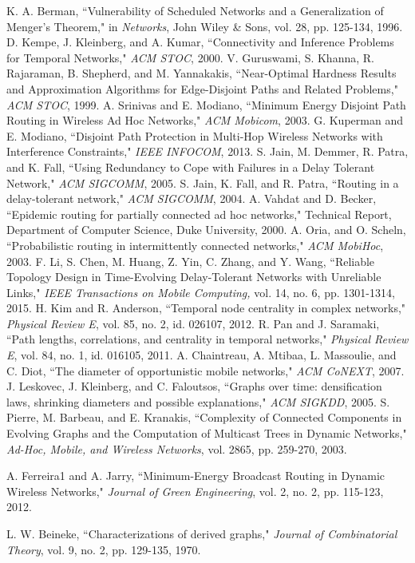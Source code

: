 \documentclass[10pt, conference, letterpaper]{IEEEtran}
\begin{document}
\begin{thebibliography}{1}
 K. A. Berman, ``Vulnerability of Scheduled Networks and a Generalization of Menger's Theorem,"  in \emph{Networks}, John Wiley \& Sons, vol. 28, pp. 125-134, 1996.
 D. Kempe, J. Kleinberg, and A. Kumar, ``Connectivity and Inference Problems for Temporal Networks," \emph{ACM STOC}, 2000.
 V. Guruswami, S. Khanna, R. Rajaraman, B. Shepherd, and M. Yannakakis, ``Near-Optimal Hardness Results and Approximation Algorithms for Edge-Disjoint Paths and Related Problems," \emph{ACM STOC}, 1999.
 A. Srinivas and E. Modiano, ``Minimum Energy Disjoint Path Routing in Wireless Ad Hoc Networks,"  \emph{ACM Mobicom}, 2003.
  G. Kuperman and E. Modiano, ``Disjoint Path Protection in Multi-Hop Wireless Networks with Interference Constraints,"  \emph{IEEE INFOCOM}, 2013.
 S. Jain, M. Demmer, R. Patra, and K. Fall, ``Using Redundancy to Cope with Failures in a Delay Tolerant Network,"  \emph{ACM SIGCOMM}, 2005.
 S. Jain, K. Fall, and R. Patra, ``Routing in a delay-tolerant network,"  \emph{ACM SIGCOMM}, 2004.
 A. Vahdat and D. Becker, ``Epidemic routing for partially connected ad hoc networks,"  Technical Report, Department of Computer Science, Duke University, 2000.
 A. Oria, and O. Scheln, ``Probabilistic routing in intermittently connected networks,"  \emph{ACM MobiHoc}, 2003.
 F. Li, S. Chen, M. Huang, Z. Yin, C. Zhang, and Y. Wang, ``Reliable Topology Design in Time-Evolving Delay-Tolerant Networks with Unreliable Links," \emph{IEEE Transactions on Mobile Computing,} vol. 14, no. 6, pp. 1301-1314, 2015.
 H. Kim and R. Anderson, ``Temporal node centrality in complex networks,"  \emph{Physical Review E}, vol. 85, no. 2, id. 026107, 2012.
 R. Pan and J. Saramaki, ``Path lengths, correlations, and centrality in temporal networks,"  \emph{Physical Review E}, vol. 84, no. 1, id. 016105, 2011.
 A. Chaintreau, A. Mtibaa, L. Massoulie, and C. Diot, ``The diameter of opportunistic mobile networks,"  \emph{ACM CoNEXT}, 2007.
 J. Leskovec, J. Kleinberg, and C. Faloutsos, ``Graphs over time: densification laws, shrinking diameters and possible explanations,"  \emph{ACM SIGKDD}, 2005.
 S. Pierre, M. Barbeau, and E. Kranakis, ``Complexity of Connected Components in Evolving Graphs and the Computation of Multicast Trees in Dynamic Networks,"  \emph{Ad-Hoc, Mobile, and Wireless Networks}, vol. 2865, pp. 259-270, 2003.

 A. Ferreira1 and A. Jarry, ``Minimum-Energy Broadcast Routing in Dynamic Wireless Networks,"  \emph{Journal of Green Engineering}, vol. 2, no. 2, pp. 115-123, 2012.

 L. W. Beineke, ``Characterizations of derived graphs,"  \emph{Journal of Combinatorial Theory}, vol. 9, no. 2, pp. 129-135, 1970.

\end{thebibliography}
\end{document}
